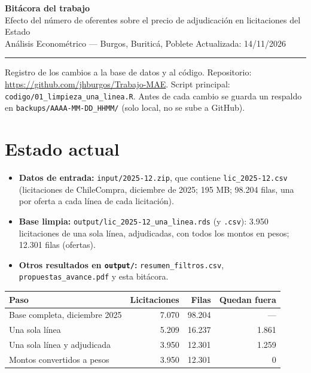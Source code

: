 \documentclass[11pt,a4paper]{article}
\newcommand{\cod}[1]{\texttt{#1}}
\begin{document}
\sloppy

{\large\bfseries\color{azul} Bitácora del trabajo}\\[2pt]
Efecto del número de oferentes sobre el precio de adjudicación en licitaciones del Estado\\
Análisis Econométrico --- Burgos, Buriticá, Poblete \hfill Actualizada: 14/11/2026

\vspace{4pt}\hrule\vspace{6pt}

Registro de los cambios a la base de datos y al código. Repositorio: \url{https://github.com/jhburgos/Trabajo-MAE}. Script principal: \cod{codigo/01\_limpieza\_una\_linea.R}. Antes de cada cambio se guarda un respaldo en \cod{backups/AAAA-MM-DD\_HHMM/} (solo local, no se sube a GitHub).

\section{Estado actual}
\begin{itemize}
  \item \textbf{Datos de entrada:} \cod{input/2025-12.zip}, que contiene \cod{lic\_2025-12.csv} (licitaciones de ChileCompra, diciembre de 2025; 195 MB; 98.204 filas, una por oferta a cada línea de cada licitación).
  \item \textbf{Base limpia:} \cod{output/lic\_2025-12\_una\_linea.rds} (y \cod{.csv}): 3.950 licitaciones de una sola línea, adjudicadas, con todos los montos en pesos; 12.301 filas (ofertas).
  \item \textbf{Otros resultados en \cod{output/}:} \cod{resumen\_filtros.csv}, \cod{propuestas\_avance.pdf} y esta bitácora.
\end{itemize}

\begin{center}
\begin{tabular}{lrrr}
\toprule
Paso & Licitaciones & Filas & Quedan fuera \\
\midrule
Base completa, diciembre 2025 & 7.070 & 98.204 & --- \\
Una sola línea & 5.209 & 16.237 & 1.861 \\
Una sola línea y adjudicada & 3.950 & 12.301 & 1.259 \\
Montos convertidos a pesos & 3.950 & 12.301 & 0 \\
\bottomrule
\end{tabular}
\end{center}
\end{document}
